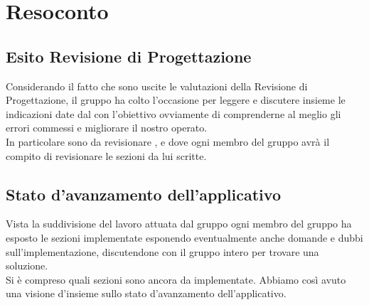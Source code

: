 \section{Resoconto}
\subsection{Esito Revisione di Progettazione} 
Considerando il fatto che sono uscite le valutazioni della Revisione di Progettazione, il gruppo ha colto l'occasione per leggere e discutere insieme le indicazioni date dal  \VT{} con l'obiettivo ovviamente di comprenderne al meglio gli errori commessi e migliorare il nostro operato. \\
In particolare sono da revisionare \NdP, \AdR{} e \PdP{} dove ogni membro del gruppo avrà il compito di revisionare le sezioni da lui scritte.

\subsection{Stato d'avanzamento dell'applicativo}
Vista la suddivisione del lavoro attuata dal gruppo ogni membro del gruppo ha esposto le sezioni implementate esponendo eventualmente anche domande e dubbi sull'implementazione, discutendone con il gruppo intero per trovare una soluzione.\\
Si è compreso quali sezioni sono ancora da implementate. Abbiamo così avuto una visione d'insieme sullo stato d'avanzamento dell'applicativo.

